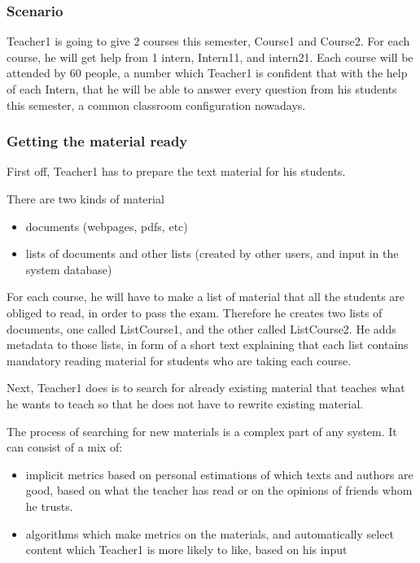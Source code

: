 \documentclass[12pt]{article}
\begin{document}
\subsubsection{Scenario} \label{use-cases-scenario}

Teacher1 is going to give 2 courses this semester, Course1 and Course2. For each course, he will get help from 1 intern, Intern11, and intern21. Each course will be attended by 60 people, a number which Teacher1 is confident that with the help of each Intern, that he will be able to answer every question from his students this semester, a common classroom configuration nowadays.

\subsubsection{Getting the material ready}

First off, Teacher1 has to prepare the text material for his students.

There are two kinds of material

\begin{itemize}
  \item documents (webpages, pdfs, etc)
  \item lists of documents and other lists (created by other users, and input in the system database)
\end{itemize}

For each course, he will have to make a list of material that all the students are obliged to read, in order to pass the exam. Therefore he creates two lists of documents, one called ListCourse1, and the other called ListCourse2. He adds metadata to those lists, in form of a short text explaining that each list contains mandatory reading material for students who are taking each course.

Next, Teacher1 does is to search for already existing material that teaches what he wants to teach so that he does not have to rewrite existing material.

The process of searching for new materials is a complex part of any system. It can consist of a mix of:

\begin{itemize}
  \item implicit metrics based on personal estimations of which texts and authors are good, based on what the teacher has read or on the opinions of friends whom he trusts.
  \item algorithms which make metrics on the materials, and automatically select content which Teacher1 is more likely to like, based on his input
\end{itemize}
\end{document}
